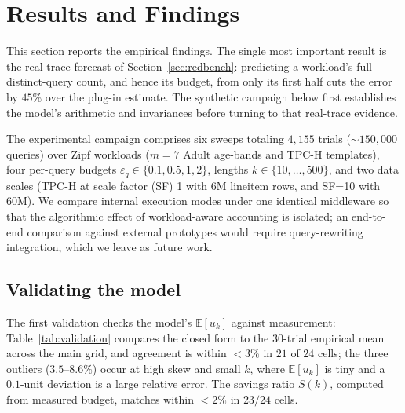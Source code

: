 \documentclass[sigconf,nonacm]{acmart}
\newcommand{\eps}{\varepsilon}
\newcommand{\E}{\mathbb{E}}
\begin{document}
\section{Results and Findings}
\label{sec:results}

\noindent This section reports the empirical findings. The single most important result is the real-trace forecast of Section~\ref{sec:redbench}: predicting a workload's full distinct-query count, and hence its budget, from only its first half cuts the error by $45\%$ over the plug-in estimate. The synthetic campaign below first establishes the model's arithmetic and invariances before turning to that real-trace evidence.

The experimental campaign comprises six sweeps totaling $4{,}155$ trials ($\sim$$150{,}000$ queries) over Zipf workloads ($m{=}7$ Adult age-bands and TPC-H templates), four per-query budgets $\eps_q\in\{0.1,0.5,1,2\}$, lengths $k\in\{10,\dots,500\}$, and two data scales (TPC-H at scale factor (SF) 1 with 6M lineitem rows, and SF=10 with 60M). We compare internal execution modes under one identical middleware so that the algorithmic effect of workload-aware accounting is isolated; an end-to-end comparison against external prototypes would require query-rewriting integration, which we leave as future work.

\subsection{Validating the model}

The first validation checks the model's $\E[u_k]$ against measurement: Table~\ref{tab:validation} compares the closed form to the 30-trial empirical mean across the main grid, and agreement is within $<3\%$ in $21$ of $24$ cells; the three outliers ($3.5$--$8.6\%$) occur at high skew and small $k$, where $\E[u_k]$ is tiny and a $0.1$-unit deviation is a large relative error. The savings ratio $S(k)$, computed from measured budget, matches within $<2\%$ in $23/24$ cells.
\end{document}
